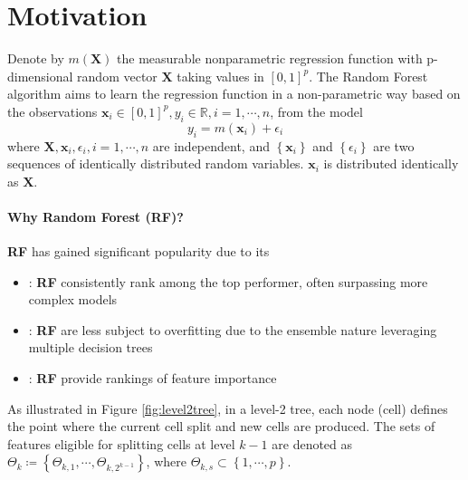 \documentclass[twoside]{article}
\begin{document}

\section{Motivation}
Denote by $m(\mathbf{X})$ the measurable nonparametric regression function with p-dimensional random vector $\mathbf{X}$ taking values in $[0,1]^p$. The Random Forest algorithm aims to learn the 
regression function in a non-parametric way based on the observations $\mathbf{x}_i \in [0,1]^p,y_i\in\mathbb{R},i=1,\cdots,n$, from the model 
$$
y_i = m(\mathbf{x}_i) + \epsilon_i
$$
where $\mathbf{X},\mathbf{x}_i,\epsilon_i,i=1,\cdots,n$ are independent, and $\left\{\mathbf{x}_i\right\}$ and $\left\{\epsilon_i\right\}$ are two sequences of identically distributed random variables. $\mathbf{x}_i$ is distributed identically as $\mathbf{X}$.

\paragraph*{Why Random Forest (RF)?} \textbf{RF} has gained significant popularity due to its
\begin{itemize}
    \item {}: \textbf{RF} consistently rank among the top performer, often surpassing more complex models
    \item {}: \textbf{RF} are less subject to overfitting due to the ensemble nature leveraging multiple decision trees
    \item {}: \textbf{RF} provide rankings of feature importance
\end{itemize}

As illustrated in Figure \ref{fig:level2tree}, in a level-2 tree, each node (cell) defines the point where the current cell split and new cells are produced. The sets of features eligible for splitting cells at level $k-1$ are denoted as $\Theta_k\coloneq \left\{\Theta_{k,1},\cdots,\Theta_{k,2^{k-1}} \right\}$, where $\Theta_{k,s}\subset \left\{ 1,\cdots,p \right\}$.
\end{document}
